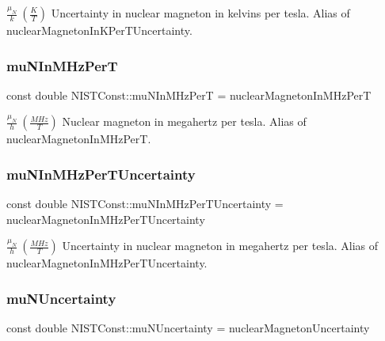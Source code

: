 $\frac{\mu_N}{k} \ (\frac{K}{T})$ Uncertainty in nuclear magneton in kelvins per tesla. Alias of nuclear\+Magneton\+In\+K\+Per\+T\+Uncertainty. \mbox{\label{group___nuclear_magneton_ga4c2e37b42112c282a0dc5969f351187e}} 
\subsubsection{\texorpdfstring{mu\+N\+In\+M\+Hz\+PerT}{muNInMHzPerT}}
{\footnotesize\ttfamily const double N\+I\+S\+T\+Const\+::mu\+N\+In\+M\+Hz\+PerT = nuclear\+Magneton\+In\+M\+Hz\+PerT}

$\frac{\mu_N}{h} \ (\frac{MHz}{T})$ Nuclear magneton in megahertz per tesla. Alias of nuclear\+Magneton\+In\+M\+Hz\+PerT. \mbox{\label{group___nuclear_magneton_ga5b70d81fc8665de09e33dc709a91e7f9}} 
\subsubsection{\texorpdfstring{mu\+N\+In\+M\+Hz\+Per\+T\+Uncertainty}{muNInMHzPerTUncertainty}}
{\footnotesize\ttfamily const double N\+I\+S\+T\+Const\+::mu\+N\+In\+M\+Hz\+Per\+T\+Uncertainty = nuclear\+Magneton\+In\+M\+Hz\+Per\+T\+Uncertainty}

$\frac{\mu_N}{h} \ (\frac{MHz}{T})$ Uncertainty in nuclear magneton in megahertz per tesla. Alias of nuclear\+Magneton\+In\+M\+Hz\+Per\+T\+Uncertainty. \mbox{\label{group___nuclear_magneton_gabe781a9d8e34ad9a0901188db9784416}} 
\subsubsection{\texorpdfstring{mu\+N\+Uncertainty}{muNUncertainty}}
{\footnotesize\ttfamily const double N\+I\+S\+T\+Const\+::mu\+N\+Uncertainty = nuclear\+Magneton\+Uncertainty}

